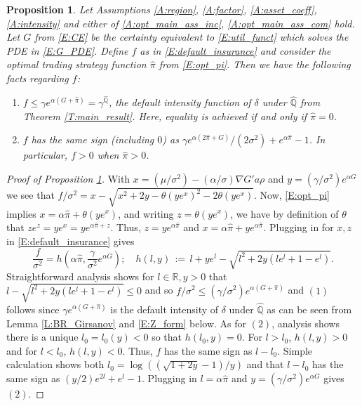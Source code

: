 \documentclass[11pt, letterpaper]{amsart}
\newtheorem{proposition}[theorem]{Proposition}
\theoremstyle{definition}
\theoremstyle{remark}
\numberwithin{equation}{section}
\newcommand{\reals}{\mathbb R}
\newcommand{\hpi}{\hat{\pi}}
\newcommand{\qprob}{\mathbb{Q}}
\newcommand{\dfn}{\, := \,}
\begin{document}
\begin{proposition}\label{P:default_insurance}
Let Assumptions \ref{A:region}, \ref{A:factor}, \ref{A:asset_coeff}, \ref{A:intensity} and either of \eqref{A:opt_main_ass_inc}, \ref{A:opt_main_ass_com} hold.  Let $G$ from \eqref{E:CE} be the certainty equivalent to \eqref{E:util_funct} which solves the PDE in \eqref{E:G_PDE}.  Define $f$ as in \eqref{E:default_insurance} and consider the optimal trading strategy function $\hpi$ from \eqref{E:opt_pi}.  Then we have the following facts regarding $f$:
\begin{enumerate}[(1)]
\item $f\leq \gamma e^{\alpha(G+\hpi)} = \gamma^{\hat{\qprob}}$, the default intensity function of $\delta$ under $\hat{\qprob}$ from Theorem \ref{T:main_result}. Here, equality is achieved if and only if $\hat{\pi} = 0$.
\item $f$ has the same sign (including $0$) as $\gamma e^{\alpha(2\hpi + G)}/(2\sigma^2) + e^{\alpha\hpi} - 1$.  In particular, $f>0$ when $\hpi > 0$.
\end{enumerate}
\end{proposition}



\begin{proof}[Proof of Proposition \ref{P:default_insurance}]
With $x=(\mu/\sigma^2)-(\alpha/\sigma)\nabla G'a\rho$ and $y=(\gamma/\sigma^2)e^{\alpha G}$ we see that $f/\sigma^2 = x - \sqrt{x^2 + 2y - \theta(ye^x)^2 - 2\theta(ye^x)}$.  Now, \eqref{E:opt_pi} implies $x = \alpha\hpi + \theta(ye^x)$, and writing $z=\theta(ye^x)$, we have by definition of $\theta$ that $ze^z = ye^x = y e^{\alpha\hpi + z}$. Thus, $z = ye^{\alpha\hpi}$ and $x=\alpha\hpi + ye^{\alpha\hpi}$.  Plugging in for $x,z$ in \eqref{E:default_insurance} gives
\begin{equation}\label{E:default_insurance_alt}
\frac{f}{\sigma^2} = h\left(\alpha\hpi,\frac{\gamma}{\sigma^2}e^{\alpha G}\right) ;\quad h(l,y) \dfn l + ye^{l} - \sqrt{l^2 + 2y(le^{l} +1 - e^l)}.
\end{equation}
Straightforward analysis shows for $l\in\reals, y>0$ that $l - \sqrt{l^2 + 2y(le^{l} +1 - e^l)}\leq 0$ and so $f/\sigma^2 \leq  (\gamma/\sigma^2)e^{\alpha(G+\hpi)}$ and $(1)$ follows since $\gamma e^{\alpha(G+\hpi)}$ is the default intensity of $\delta$ under $\hat{\qprob}$ as can be seen from Lemma \ref{L:BR_Girsanov} and \eqref{E:Z_form} below.  As for $(2)$, analysis shows there is a unique $l_0 = l_0(y) < 0$ so that $h(l_0,y) = 0$.  For $l>l_0$, $h(l,y)>0$ and for $l<l_0$, $h(l,y) < 0$.  Thus, $f$ has the same sign as $l-l_0$. Simple calculation shows both $l_0 = \log((\sqrt{1+2y}-1)/y)$ and that $l-l_0$ has the same sign as $(y/2)e^{2l} + e^l -1$. Plugging in $l=\alpha\hpi$ and $y=(\gamma/\sigma^2)e^{\alpha G}$ gives $(2)$.

\end{proof}
\end{document}
